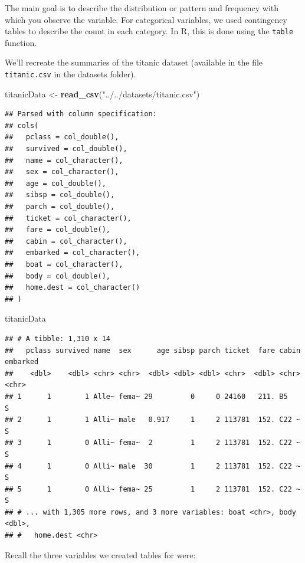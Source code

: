 \documentclass[
]{book}
\newenvironment{Shaded}{\begin{snugshade}}{\end{snugshade}}
\newcommand{\KeywordTok}[1]{\textcolor[rgb]{0.13,0.29,0.53}{\textbf{#1}}}
\newcommand{\NormalTok}[1]{#1}
\newcommand{\StringTok}[1]{\textcolor[rgb]{0.31,0.60,0.02}{#1}}
\theoremstyle{definition}
\theoremstyle{definition}
\theoremstyle{definition}
\theoremstyle{remark}
\begin{document}
The main goal is to describe the distribution or pattern and frequency with which you observe the variable. For categorical variables, we used contingency tables to describe the count in each category. In R, this is done using the \texttt{table} function.

We'll recreate the summaries of the titanic dataset (available in the file \texttt{titanic.csv} in the datasets folder).

\begin{Shaded}
\begin{Highlighting}[]
\NormalTok{titanicData <-}\StringTok{ }\KeywordTok{read_csv}\NormalTok{(}\StringTok{"../../datasets/titanic.csv"}\NormalTok{)}
\end{Highlighting}
\end{Shaded}

\begin{verbatim}
## Parsed with column specification:
## cols(
##   pclass = col_double(),
##   survived = col_double(),
##   name = col_character(),
##   sex = col_character(),
##   age = col_double(),
##   sibsp = col_double(),
##   parch = col_double(),
##   ticket = col_character(),
##   fare = col_double(),
##   cabin = col_character(),
##   embarked = col_character(),
##   boat = col_character(),
##   body = col_double(),
##   home.dest = col_character()
## )
\end{verbatim}

\begin{Shaded}
\begin{Highlighting}[]
\NormalTok{titanicData}
\end{Highlighting}
\end{Shaded}

\begin{verbatim}
## # A tibble: 1,310 x 14
##   pclass survived name  sex      age sibsp parch ticket  fare cabin embarked
##    <dbl>    <dbl> <chr> <chr>  <dbl> <dbl> <dbl> <chr>  <dbl> <chr> <chr>   
## 1      1        1 Alle~ fema~ 29         0     0 24160   211. B5    S       
## 2      1        1 Alli~ male   0.917     1     2 113781  152. C22 ~ S       
## 3      1        0 Alli~ fema~  2         1     2 113781  152. C22 ~ S       
## 4      1        0 Alli~ male  30         1     2 113781  152. C22 ~ S       
## 5      1        0 Alli~ fema~ 25         1     2 113781  152. C22 ~ S       
## # ... with 1,305 more rows, and 3 more variables: boat <chr>, body <dbl>,
## #   home.dest <chr>
\end{verbatim}

Recall the three variables we created tables for were:
\end{document}
